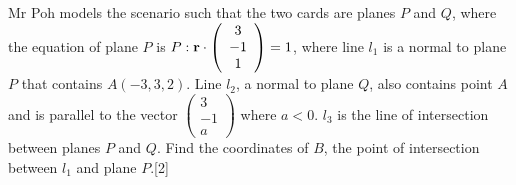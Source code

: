 \documentclass[12pt, a4 paper]{article}
\begin{document}
\begin{outline}[enumerate]
					Mr Poh models the scenario such that the two cards are planes $P$ and $Q$, where the equation of plane $P$ is $P:{\bf{r}} \cdot \left( {\begin{array}{*{20}{c}}3\\{ - 1}\\1\end{array}} \right) = 1$, where line ${l_1}$ is a normal to plane $P$ that contains $A( - 3,3,2)$. Line ${l_2}$, a normal to plane $Q$, also contains point $A$ and is parallel to the vector $\left( {\begin{array}{*{20}{c}}3\\{ - 1}\\a\end{array}} \right)$ where $a < 0$. ${l_3}$ is the line of intersection between planes $P$ and $Q$.
					\2 Find the coordinates of $B$, the point of intersection between ${l_1}$ and plane $P$.\hfill[2]
					\color{blue}

\end{outline}
\end{document}
